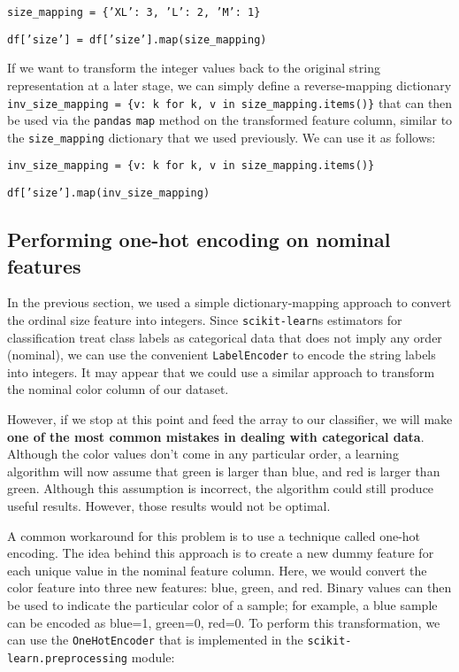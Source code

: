 \documentclass[11pt]{article}
\begin{document}
    \texttt{size\_mapping = \{'XL': 3, 'L': 2, 'M': 1\}}

    \texttt{df['size'] = df['size'].map(size\_mapping)}

    If we want to transform the integer values back to the original string representation at a later stage, we can simply define a reverse-mapping dictionary \texttt{inv\_size\_mapping = \{v: k for k, v in size\_mapping.items()\}} that can then be used via the \texttt{pandas} \texttt{map} method on the transformed feature column, similar to the \texttt{size\_mapping} dictionary that we used previously.
    We can use it as follows:

    \texttt{inv\_size\_mapping = \{v: k for k, v in size\_mapping.items()\}}

    \texttt{df['size'].map(inv\_size\_mapping)}

    \subsection{Performing one-hot encoding on nominal features} \label{subsec:nominal_one_hot_encoding}

    In the previous section, we used a simple dictionary-mapping approach to convert the ordinal size feature into integers.
    Since \texttt{scikit-learn}s estimators for classification treat class labels as categorical data that does not imply any order (nominal), we can use the convenient \texttt{LabelEncoder} to encode the string labels into integers.
    It may appear that we could use a similar approach to transform the nominal color column of our dataset.

    However, if we stop at this point and feed the array to our classifier, we will make \textbf{one of the most common mistakes in dealing with categorical data}.
    Although the color values don't come in any particular order, a learning algorithm will now assume that green is larger than blue, and red is larger than green.
    Although this assumption is incorrect, the algorithm could still produce useful results.
    However, those results would not be optimal.

    A common workaround for this problem is to use a technique called one-hot encoding.
    The idea behind this approach is to create a new dummy feature for each unique value in the nominal feature column.
    Here, we would convert the color feature into three new features: blue, green, and red.
    Binary values can then be used to indicate the particular color of a sample; for example, a blue sample can be encoded as blue=1, green=0, red=0.
    To perform this transformation, we can use the \texttt{OneHotEncoder} that is implemented in the \texttt{scikit-learn.preprocessing} module:
\end{document}

